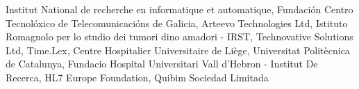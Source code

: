 Institut National de recherche en informatique et automatique,
Fundación Centro Tecnolóxico de Telecomunicacións de Galicia,
Arteevo Technologies Ltd,
Istituto Romagnolo per lo studio dei tumori dino amadori - IRST,
Technovative Solutions Ltd,  
Time.Lex,
Centre Hospitalier Universitaire de Liège, 
Universitat Politècnica de Catalunya,
Fundacio Hospital Universitari Vall d'Hebron - Institut De
Recerca,
HL7 Europe Foundation,
Quibim Sociedad Limitada